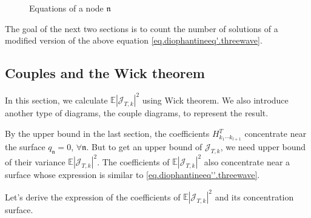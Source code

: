 \begin{figure}[H]
    \centering
        \caption{Equations of a node $\mathfrak{n}$}
        \label{fig.equations}
    \end{figure}
    

The goal of the next two sections is to count the number of solutions of a modified version of the above equation \eqref{eq.diophantineeq'.threewave}. 

\subsection{Couples and the Wick theorem}\label{sec.coupwick} In this section, we calculate $\mathbb{E}|\mathcal{J}_{T,k}|^2$ using Wick theorem. We also introduce another type of diagrams, the couple diagrams, to represent the result.

By the upper bound in the last section, the coefficients $H^T_{k_1\cdots k_{l+1}}$ concentrate near the surface $q_{\mathfrak{n}}=0$, $\forall \mathfrak{n}$. But to get an upper bound of $\mathcal{J}_{T,k}$, we need upper bound of their variance $\mathbb{E}|\mathcal{J}_{T,k}|^2$. The coefficients of $\mathbb{E}|\mathcal{J}_{T,k}|^2$ also concentrate near a surface whose expression is similar to \eqref{eq.diophantineeq''.threewave}. 

Let's derive the expression of the coefficients of $\mathbb{E}|\mathcal{J}_{T,k}|^2$ and its concentration surface.

